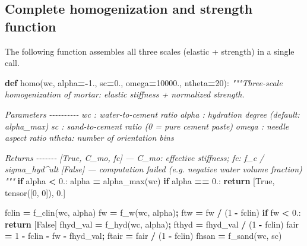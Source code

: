 \documentclass[
  a4paper,
  numbers=noendperiod,
  DIV=12]{scrreprt}
\newenvironment{Shaded}{\begin{snugshade}}{\end{snugshade}}
\newcommand{\CommentTok}[1]{\textcolor[rgb]{0.56,0.35,0.01}{\textit{#1}}}
\newcommand{\ControlFlowTok}[1]{\textcolor[rgb]{0.13,0.29,0.53}{\textbf{#1}}}
\newcommand{\DecValTok}[1]{\textcolor[rgb]{0.00,0.00,0.81}{#1}}
\newcommand{\FloatTok}[1]{\textcolor[rgb]{0.00,0.00,0.81}{#1}}
\newcommand{\KeywordTok}[1]{\textcolor[rgb]{0.13,0.29,0.53}{\textbf{#1}}}
\newcommand{\NormalTok}[1]{#1}
\newcommand{\OperatorTok}[1]{\textcolor[rgb]{0.81,0.36,0.00}{\textbf{#1}}}
\newcommand{\VariableTok}[1]{\textcolor[rgb]{0.00,0.00,0.00}{#1}}
\begin{document}
\subsection{Complete homogenization and strength
function}\label{sec-homo-fn}

The following function assembles all three scales (elastic + strength)
in a single call.

\begin{Shaded}
\begin{Highlighting}[]
\KeywordTok{def}\NormalTok{ homo(wc, alpha}\OperatorTok{={-}}\FloatTok{1.}\NormalTok{, sc}\OperatorTok{=}\FloatTok{0.}\NormalTok{, omega}\OperatorTok{=}\FloatTok{10000.}\NormalTok{, ntheta}\OperatorTok{=}\DecValTok{20}\NormalTok{):}
    \CommentTok{"""Three{-}scale homogenization of mortar: elastic stiffness + normalized strength.}

\CommentTok{    Parameters}
\CommentTok{    {-}{-}{-}{-}{-}{-}{-}{-}{-}{-}}
\CommentTok{    wc    : water{-}to{-}cement ratio}
\CommentTok{    alpha : hydration degree (default: alpha\_max)}
\CommentTok{    sc    : sand{-}to{-}cement ratio (0 = pure cement paste)}
\CommentTok{    omega : needle aspect ratio}
\CommentTok{    ntheta: number of orientation bins}

\CommentTok{    Returns}
\CommentTok{    {-}{-}{-}{-}{-}{-}{-}}
\CommentTok{    [True, C\_mo, fc]  — C\_mo: effective stiffness; fc: f\_c / sigma\_hyd\^{}ult}
\CommentTok{    [False]           — computation failed (e.g. negative water volume fraction)}
\CommentTok{    """}
    \ControlFlowTok{if}\NormalTok{ alpha }\OperatorTok{\textless{}} \FloatTok{0.}\NormalTok{:}
\NormalTok{        alpha }\OperatorTok{=}\NormalTok{ alpha\_max(wc)}
    \ControlFlowTok{if}\NormalTok{ alpha }\OperatorTok{==} \FloatTok{0.}\NormalTok{:}
        \ControlFlowTok{return}\NormalTok{ [}\VariableTok{True}\NormalTok{, tensor([}\DecValTok{0}\NormalTok{, }\DecValTok{0}\NormalTok{]), }\FloatTok{0.}\NormalTok{]}

\NormalTok{    fclin }\OperatorTok{=}\NormalTok{ f\_clin(wc, alpha)}
\NormalTok{    fw    }\OperatorTok{=}\NormalTok{ f\_w(wc, alpha)}\OperatorTok{;}\NormalTok{   ftw   }\OperatorTok{=}\NormalTok{ fw   }\OperatorTok{/}\NormalTok{ (}\DecValTok{1} \OperatorTok{{-}}\NormalTok{ fclin)}
    \ControlFlowTok{if}\NormalTok{ fw }\OperatorTok{\textless{}} \FloatTok{0.}\NormalTok{:}
        \ControlFlowTok{return}\NormalTok{ [}\VariableTok{False}\NormalTok{]}
\NormalTok{    fhyd\_val }\OperatorTok{=}\NormalTok{ f\_hyd(wc, alpha)}\OperatorTok{;}\NormalTok{ fthyd }\OperatorTok{=}\NormalTok{ fhyd\_val }\OperatorTok{/}\NormalTok{ (}\DecValTok{1} \OperatorTok{{-}}\NormalTok{ fclin)}
\NormalTok{    fair     }\OperatorTok{=} \DecValTok{1} \OperatorTok{{-}}\NormalTok{ fclin }\OperatorTok{{-}}\NormalTok{ fw }\OperatorTok{{-}}\NormalTok{ fhyd\_val}\OperatorTok{;}\NormalTok{ ftair }\OperatorTok{=}\NormalTok{ fair }\OperatorTok{/}\NormalTok{ (}\DecValTok{1} \OperatorTok{{-}}\NormalTok{ fclin)}
\NormalTok{    fhsan    }\OperatorTok{=}\NormalTok{ f\_sand(wc, sc)}


\end{Highlighting}
\end{Shaded}
\end{document}
